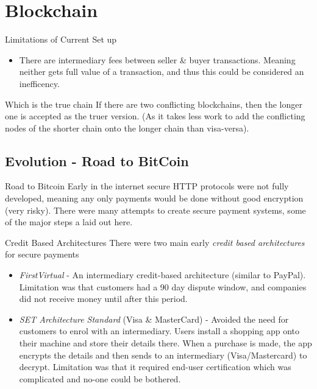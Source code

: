 \documentclass[11pt,a4paper]{article}
\begin{document}
\section{Blockchain}

  \begin{remark}{Limitations of Current Set up}
    \begin{itemize}
      \item There are intermediary fees between seller \& buyer transactions. Meaning neither gets full value of a transaction, and thus this could be considered an inefficency.
    \end{itemize}
  \end{remark}

  \begin{remark}{Which is the true chain}
    If there are two conflicting blockchains, then the longer one is accepted as the truer version. (As it takes less work to add the conflicting nodes of the shorter chain onto the longer chain than visa-versa).
  \end{remark}

\subsection{Evolution - Road to BitCoin}

  \begin{remark}{Road to Bitcoin}
    Early in the internet secure HTTP protocols were not fully developed, meaning any only payments would be done without good encryption (very risky). There were many attempts to create secure payment systems, some of the major steps a laid out here.
  \end{remark}

  \begin{proposition}{Credit Based Architectures}
    There were two main early \textit{credit based architectures} for secure payments
    \begin{itemize}
      \item \textit{FirstVirtual} - An intermediary credit-based architecture (similar to PayPal). Limitation was that customers had a 90 day dispute window, and companies did not receive money until after this period.
      \item \textit{SET Architecture Standard} (Visa \& MasterCard) - Avoided the need for customers to enrol with an intermediary. Users install a shopping app onto their machine and store their details there. When a purchase is made, the app encrypts the details and then sends to an intermediary (Visa/Mastercard) to decrypt. Limitation was that it required end-user certification which was complicated and no-one could be bothered.
    \end{itemize}
  \end{proposition}
\end{document}
